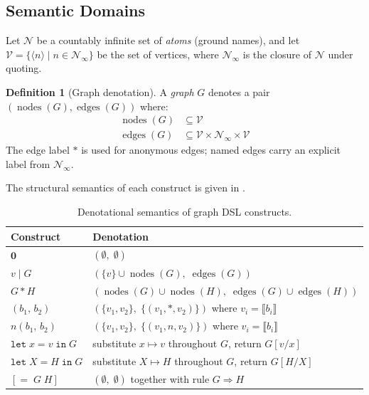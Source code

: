 \documentclass[11pt, a4paper]{article}
\theoremstyle{definition}
\newtheorem{definition}{Definition}[section]
\theoremstyle{plain}
\theoremstyle{remark}
\newcommand{\edges}{\operatorname{edges}}
\newcommand{\nodes}{\operatorname{nodes}}
\newcommand{\GNil}{\mathbf{0}}
\newcommand{\tensor}{\mathbin{*}}
\begin{document}
\subsection{Semantic Domains}

Let $\mathcal{N}$ be a countably infinite set of \emph{atoms} (ground names),
and let $\mathcal{V} = \{ \langle n \rangle \mid n \in \mathcal{N}_\infty \}$
be the set of vertices, where $\mathcal{N}_\infty$ is the closure of
$\mathcal{N}$ under quoting.

\begin{definition}[Graph denotation]
\label{def:denotation}
A \emph{graph} $G$ denotes a pair $(\nodes(G), \edges(G))$ where:
\begin{align*}
  \nodes(G) &\subseteq \mathcal{V}\\
  \edges(G) &\subseteq \mathcal{V} \times \mathcal{N}_\infty \times \mathcal{V}
\end{align*}
The edge label $*$ is used for anonymous edges; named edges carry an explicit
label from $\mathcal{N}_\infty$.
\end{definition}

The structural semantics of each construct is given in .

\begin{table}[ht]
\centering
\caption{Denotational semantics of graph DSL constructs.}
\label{tab:semantics}
\renewcommand{\arraystretch}{1.4}
\begin{tabular}{@{} l l @{}}
\toprule
\textbf{Construct} & \textbf{Denotation} \\
\midrule
$\GNil$ & $(\emptyset,\; \emptyset)$ \\
$v \mid G$ & $(\{v\} \cup \nodes(G),\; \edges(G))$ \\
$G \tensor H$ & $(\nodes(G)\cup\nodes(H),\; \edges(G)\cup\edges(H))$ \\
$(b_1,\, b_2)$ & $(\{v_1,v_2\},\; \{(v_1,*,v_2)\})$ where $v_i=\llbracket b_i\rrbracket$ \\
$n(b_1,\, b_2)$ & $(\{v_1,v_2\},\; \{(v_1,n,v_2)\})$ where $v_i=\llbracket b_i\rrbracket$ \\
$\texttt{let}\; x = v\; \texttt{in}\; G$ & substitute $x \mapsto v$ throughout $G$, return $G[v/x]$ \\
$\texttt{let}\; X = H\; \texttt{in}\; G$ & substitute $X \mapsto H$ throughout $G$, return $G[H/X]$ \\
$[{=}\; G\; H]$ & $(\emptyset,\; \emptyset)$ together with rule $G \Rightarrow H$ \\
\bottomrule
\end{tabular}
\end{table}
\end{document}
